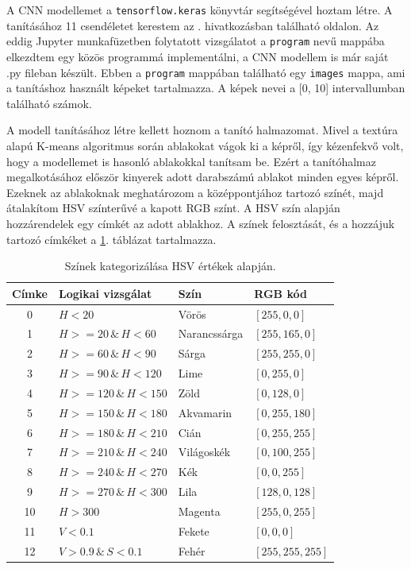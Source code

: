 
A CNN modellemet a \texttt{tensorflow.keras} könyvtár segítségével hoztam létre. A tanításához 11 csendéletet kerestem az \cite{unsplash}. hivatkozásban található oldalon. Az eddig Jupyter munkafüzetben folytatott vizsgálatot a \texttt{program} nevű mappába elkezdtem egy közös programmá implementálni, a CNN modellem is már saját .py fileban készült. Ebben a \texttt{program} mappában található egy \texttt{images} mappa, ami a tanításhoz használt képeket tartalmazza. A képek nevei a [0, 10] intervallumban található számok.

A modell tanításához létre kellett hoznom a tanító halmazomat. Mivel a textúra alapú K-means algoritmus során ablakokat vágok ki a képről, így kézenfekvő volt, hogy a modellemet is hasonló ablakokkal tanítsam be. Ezért a tanítóhalmaz megalkotásához először kinyerek adott darabszámú ablakot minden egyes képről. Ezeknek az ablakoknak meghatározom a középpontjához tartozó színét, majd átalakítom HSV színterűvé a kapott RGB színt. A HSV szín alapján hozzárendelek egy címkét az adott ablakhoz. A színek felosztását, és a hozzájuk tartozó címkéket a \ref{tab:color_category}. táblázat tartalmazza.

\begin{table}[h]
\centering
\caption{Színek kategorizálása HSV értékek alapján.}
\label{tab:color_category}
\medskip
\begin{tabular}{|c|l|l|l|}
\hline
Címke & Logikai vizsgálat & Szín & RGB kód \\
\hline
0 & $H < 20$ & Vörös & $[255, 0, 0]$ \\
\hline
1 & $H >=20 \, \& \, H < 60$ & Narancssárga & $[255, 165, 0]$ \\
\hline
2 & $H >=60 \, \& \, H < 90$ & Sárga & $[255, 255, 0]$ \\
\hline
3 & $H >=90 \, \& \, H < 120$ & Lime & $[0, 255, 0]$ \\
\hline
4 & $H >=120 \, \& \, H < 150$ & Zöld & $[0, 128, 0]$ \\
\hline
5 & $H >=150 \, \& \, H < 180$ & Akvamarin & $[0, 255, 180]$ \\
\hline
6 & $H >=180 \, \& \, H < 210$ & Cián & $[0, 255, 255]$ \\
\hline
7 & $H >=210 \, \& \, H < 240$ & Világoskék & $[0, 100, 255]$ \\
\hline
8 & $H >=240 \, \& \, H < 270$ & Kék & $[0, 0, 255]$ \\
\hline
9 & $H >=270 \, \& \, H < 300$ & Lila & $[128, 0, 128]$ \\
\hline
10 & $H > 300$ & Magenta & $[255, 0, 255]$ \\
\hline
11 & $V < 0.1$ & Fekete & $[0, 0, 0]$ \\
\hline
12 & $V > 0.9 \, \& \, S < 0.1$ & Fehér & $[255, 255, 255]$\\
\hline
\end{tabular}

\end{table}

